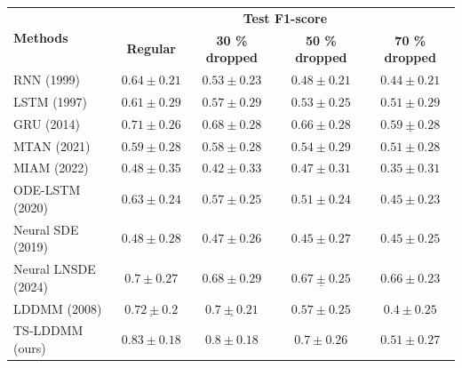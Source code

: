 \begin{table}[hbt!]
  \centering
  \begin{tabular}{lcccc}
    \toprule
    \multirow[c]{2}{*}{\textbf{Methods}} & \multicolumn{4}{c}{\textbf{Test F1-score}} \\
    \cline{2-5}
     &  \textbf{Regular} & \textbf{30 \% dropped} &  \textbf{50 \% dropped} & \textbf{70 \% dropped} \\
    \midrule
    RNN (1999) & $0.64 \pm 0.21$ & $0.53 \pm 0.23$ & $0.48 \pm 0.21$ & $0.44 \pm 0.21$ \\
    LSTM (1997) & $0.61 \pm 0.29$ & $0.57 \pm 0.29$ & $0.53 \pm 0.25$ & $0.51 \pm 0.29$ \\
    GRU (2014) & $0.71 \pm 0.26$ & $0.68 \pm 0.28$ & $0.66 \pm 0.28$ & $\underline{0.59 \pm 0.28}$ \\
    MTAN (2021) & $0.59 \pm 0.28$ & $0.58 \pm 0.28$ & $0.54 \pm 0.29$ & $0.51 \pm 0.28$ \\
    MIAM (2022) & $0.48 \pm 0.35$ & $0.42 \pm 0.33$ & $0.47 \pm 0.31$ & $0.35 \pm 0.31$ \\
    ODE-LSTM (2020) & $0.63 \pm 0.24$ & $0.57 \pm 0.25$ & $0.51 \pm 0.24$ & $0.45 \pm 0.23$ \\
    Neural SDE (2019) & $0.48 \pm 0.28$ & $0.47 \pm 0.26$ & $0.45 \pm 0.27$ & $0.45 \pm 0.25$ \\
    Neural LNSDE (2024) & $0.7 \pm 0.27$ & $0.68 \pm 0.29$ & $\underline{0.67 \pm 0.25}$ & $\mathbf{0.66 \pm 0.23}$ \\
    LDDMM (2008) & $\underline{0.72 \pm 0.2}$ & $\underline{0.7 \pm 0.21}$ & $0.57 \pm 0.25$ & $0.4 \pm 0.25$ \\
    TS-LDDMM (ours) & $\mathbf{0.83 \pm 0.18}$ & $\mathbf{0.8 \pm 0.18}$ & $\mathbf{0.7 \pm 0.26}$ & $0.51 \pm 0.27$ \\
    \bottomrule
  \end{tabular}  
\end{table}




    

